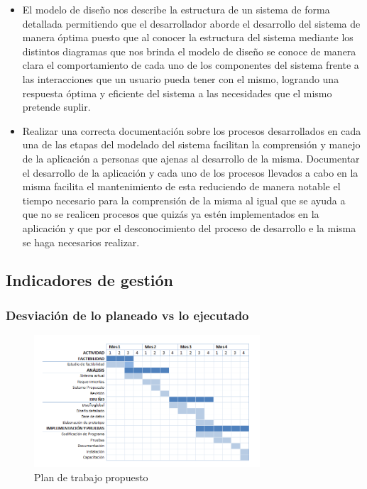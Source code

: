 \documentclass[12pt,oneside,letterpaper]{report}
\begin{document}
\begin{itemize}
 \item El modelo de diseño nos describe la estructura de un sistema de forma detallada permitiendo que el desarrollador aborde el desarrollo del sistema de manera óptima puesto que al conocer la estructura del sistema mediante los distintos diagramas que nos brinda el modelo de diseño se conoce de manera clara el comportamiento de cada uno de los componentes del sistema frente a las interacciones que un usuario pueda tener con el mismo, logrando una respuesta óptima y eficiente del sistema a las necesidades que el mismo pretende suplir.
 \item Realizar una correcta documentación sobre los procesos desarrollados en cada una de las etapas del modelado del sistema facilitan la comprensión y manejo de la aplicación a personas que ajenas al desarrollo de la misma. Documentar el desarrollo de la aplicación y cada uno de los procesos llevados a cabo en la misma facilita el mantenimiento de esta reduciendo de manera notable el tiempo necesario para la comprensión de la misma al igual que se ayuda a que no se realicen procesos que quizás ya estén implementados en la aplicación y que por el desconocimiento del proceso de desarrollo e la misma se haga necesarios realizar.
\end{itemize}

\subsection{Indicadores de gestión}
\subsubsection{Desviación de lo planeado vs lo ejecutado}

\begin{figure}[h!]
  \centering
    \includegraphics[width=0.75\textwidth]{./img/cal1.png}
  \caption{Plan de trabajo propuesto}
\end{figure}
 
\end{document}
